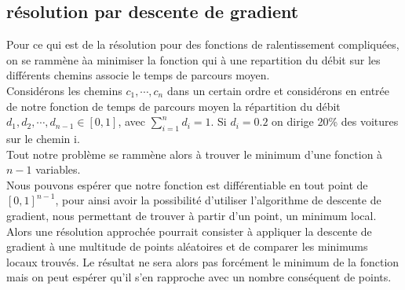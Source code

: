 \documentclass{article}
\begin{document}
\subsection{résolution par descente de gradient}
Pour ce qui est de la résolution pour des fonctions de ralentissement compliquées,
on se rammène àa minimiser la fonction qui à une repartition du débit sur les
différents chemins associe le temps de parcours moyen.\\
Considérons les chemins $c_1,\cdots,c_n$ dans un certain ordre et considérons
en entrée de notre fonction de temps de parcours moyen la répartition du débit
$d_1,d_2,\cdots,d_{n-1} \in [0,1]$, avec $\sum_{i=1}^n d_i = 1$. Si $d_i=0.2$
on dirige 20\% des voitures sur le chemin i.\\
Tout notre problème se rammène alors à trouver le minimum d'une fonction à
$n-1$ variables.\\
Nous pouvons espérer que notre fonction est différentiable en tout point de
$[0,1]^{n-1}$, pour ainsi avoir la possibilité d'utiliser l'algorithme de
descente de gradient, nous permettant de trouver à partir d'un point,
un minimum local. Alors une résolution approchée pourrait consister à
appliquer la descente de gradient à une multitude de points aléatoires et de
comparer les minimums locaux trouvés. Le résultat ne sera alors pas forcément
le minimum de la fonction mais on peut espérer qu'il s'en rapproche avec un
nombre conséquent de points.
\newpage
\end{document}

